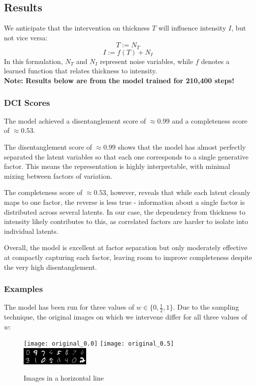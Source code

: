 \documentclass{article}
\begin{document}
	\subsection{Results}
	
	We anticipate that the intervention on thickness $T$ will influence intensity $I$, but not vice versa:
	$$ T := N_T $$
	$$ I := f(T) + N_I $$
	In this formulation, $N_T$ and $N_I$ represent noise variables, while $f$ denotes a learned function that relates thickness to intensity. \\
	
	\textbf{\normalsize Note: Results below are from the model trained for 210,400 steps!}
	
	\subsubsection*{DCI Scores}
	
	The model achieved a disentanglement score of $\approx 0.99$ and a completeness score of $\approx 0.53$.   
	
	The disentanglement score of $\approx 0.99$ shows that the model has almost perfectly separated the latent variables so that each one corresponds to a single generative factor. This means the representation is highly interpretable, with minimal mixing between factors of variation.  
	
	The completeness score of $\approx 0.53$, however, reveals that while each latent cleanly maps to one factor, the reverse is less true - information about a single factor is distributed across several latents. In our case, the dependency from thickness to intensity likely contributes to this, as correlated factors are harder to isolate into individual latents.  
	
	Overall, the model is excellent at factor separation but only moderately effective at compactly capturing each factor, leaving room to improve completeness despite the very high disentanglement.
	
	\subsubsection*{Examples}
	
	The model has been run for three values of $w \in \{0, \frac{1}{2}, 1\}$. Due to the sampling technique, the original images on which we intervene differ for all three values of $w$:
	
	\begin{figure}[H]
		\centering
		\texttt{[image: original\_0.0]} \hfill
		\texttt{[image: original\_0.5]} \hfill
		\includegraphics[width=0.3\textwidth]{original_1.0}
		\caption{Images in a horizontal line}
		\label{fig:original_images}
	\end{figure}
	
\end{document}

